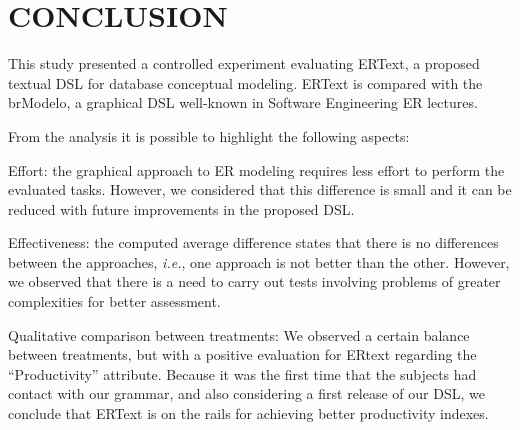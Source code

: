 \documentclass[a4paper,twoside,anonymous]{article}
\begin{document}
\section{\uppercase{Conclusion}}
\label{sec:conclusion}

This study presented a controlled experiment evaluating ERText, a proposed textual DSL for database conceptual modeling. ERText is compared with the brModelo, a graphical DSL well-known in Software Engineering ER lectures. 

From the analysis it is possible to highlight the following aspects:
\begin{inparaenum}[(i)]
\item Effort: the graphical approach to ER modeling requires less effort to perform the evaluated tasks. However, we considered that this difference is small and it can be reduced with future improvements in the proposed DSL.
\item Effectiveness: the computed average difference states that there is no differences between the approaches, \textit{i.e.}, one approach is not better than the other. 
However, we observed that there is a need to carry out tests involving problems of greater complexities for better assessment.
\item Qualitative comparison between treatments: We observed a certain balance between treatments, but with a positive evaluation for ERtext regarding the 
``Productivity'' attribute.
Because it was the first time that the subjects had contact with our grammar, and also considering a first release of our DSL, we conclude that ERText is on the rails for achieving better productivity indexes.
\end{inparaenum}
\end{document}
